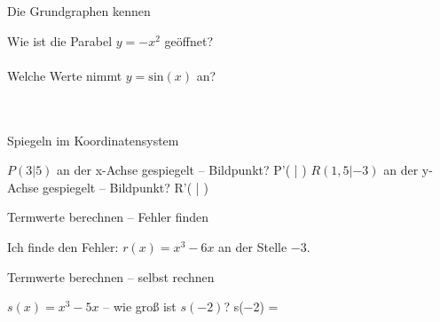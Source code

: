 \begin{aufgabe}{Die Grundgraphen kennen}
\begin{teile}
\teil Wie ist die Parabel $y = -x^2$ geöffnet? \\  \\ 
\teil Welche Werte nimmt $y = \mathrm{sin}(x)$ an? \\  \\  \\ 
\end{teile}
\end{aufgabe}

\begin{aufgabe}{Spiegeln im Koordinatensystem}
\begin{teile}
\teil $P(3 | 5)$ an der x-Achse gespiegelt – Bildpunkt? P'( \leerfeld | \leerfeld )
\teil $R(1{,}5 | -3)$ an der y-Achse gespiegelt – Bildpunkt? R'( \leerfeld | \leerfeld )
\end{teile}
\end{aufgabe}

\begin{aufgabe}{Termwerte berechnen – Fehler finden}
\begin{teile}
\teil Ich finde den Fehler: $r(x) = x^3 - 6x$ an der Stelle $-3$. 
\end{teile}
\end{aufgabe}

\begin{aufgabe}{Termwerte berechnen – selbst rechnen}
\begin{teile}
\teil $s(x) = x^3 - 5x$ – wie groß ist $s(-2)$? s(−2) = \leerfeld
\end{teile}
\end{aufgabe}
